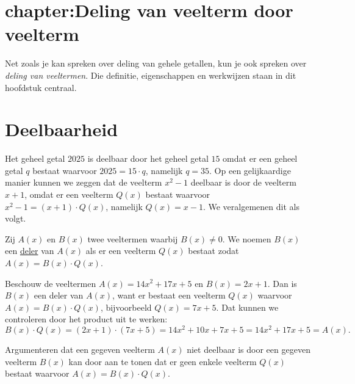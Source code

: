 \documentclass{ximera}
\begin{document}
\section{chapter:Deling van veelterm door veelterm}\label{hoofdstuk:2}

Net zoals je kan spreken over deling van gehele getallen, kun je ook spreken over {\em deling van veeltermen}. Die definitie, eigenschappen en werkwijzen staan in dit hoofdstuk centraal. 














\section{Deelbaarheid}

Het geheel getal $2025$ is deelbaar door het geheel getal $15$ omdat er een geheel getal $q$ bestaat waarvoor $2025 = 15\cdot q$, namelijk $q = 35$. Op een gelijkaardige manier kunnen we zeggen dat de veelterm $x^2-1$ deelbaar is door de veelterm $x+1$, omdat er een veelterm $Q(x)$ bestaat waarvoor $x^2-1 = (x+1)\cdot Q(x)$, namelijk $Q(x) = x-1$. We veralgemenen dit als volgt.

\begin{definition} 
Zij $A(x)$ en $B(x)$ twee veeltermen waarbij $B(x) \neq 0$. 
We noemen $B(x)$ een \underline{deler} van $A(x)$ als er een veelterm $Q(x)$ bestaat zodat $A(x) = B(x)\cdot Q(x)$.
\end{definition} 

\begin{example} 
Beschouw de veeltermen $A(x) = 14x^2+17x+5$ en $B(x) = 2x+1$. Dan is $B(x)$ een deler van $A(x)$, want er bestaat een veelterm $Q(x)$ waarvoor $A(x) = B(x) \cdot Q(x)$, bijvoorbeeld $Q(x) = 7x+5$. Dat kunnen we controleren door het product %
uit te werken:
\[
B(x) \cdot Q(x) = (2x+1) \cdot (7x+5) = 14x^2 + 10x + 7x + 5 = 14x^2 + 17x + 5 = A(x).
\]
\end{example} 

Argumenteren dat een gegeven veelterm $A(x)$ niet deelbaar is door een gegeven veelterm $B(x)$ kan door aan te tonen dat er geen enkele veelterm $Q(x)$ bestaat waarvoor $A(x) = B(x) \cdot Q(x)$. 
\end{document}
